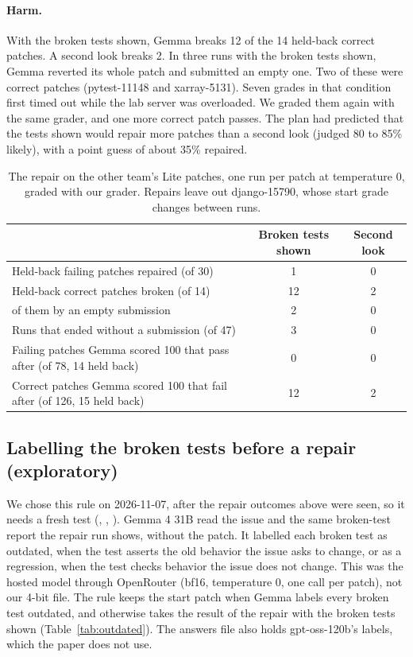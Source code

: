 \documentclass[10pt,letterpaper]{article}
\begin{document}
\paragraph{Harm.} With the broken tests shown, Gemma
breaks 12 of the 14 held-back correct patches. A second look breaks 2. In three runs with the broken tests shown,
Gemma reverted its whole patch and submitted an empty one. Two of these were correct patches (pytest-11148 and
xarray-5131). Seven grades in that condition first timed out while the lab server was overloaded. We graded them again
with the same grader, and one more correct patch passes. The plan had predicted that the tests shown would repair more
patches than a second look (judged 80 to 85\% likely), with a point guess of about 35\% repaired.

\begin{table}[H]
\centering
\small
\caption{The repair on the other team's Lite patches, one run per patch at temperature 0, graded with our grader.
Repairs leave out django-15790, whose start grade changes between runs.}
\label{tab:literepair}
\begin{tabular}{@{}lcc@{}}
\toprule
 & Broken tests shown & Second look \\
\midrule
Held-back failing patches repaired (of 30) & 1 & 0 \\
Held-back correct patches broken (of 14) & 12 & 2 \\
\quad of them by an empty submission & 2 & 0 \\
Runs that ended without a submission (of 47) & 3 & 0 \\
Failing patches Gemma scored 100 that pass after (of 78, 14 held back) & 0 & 0 \\
Correct patches Gemma scored 100 that fail after (of 126, 15 held back) & 12 & 2 \\
\bottomrule
\end{tabular}
\end{table}

\subsection*{Labelling the broken tests before a repair (exploratory)}

We chose this rule on 2026-11-07, after the repair outcomes above were seen, so it needs a fresh test
(, , ).
Gemma 4 31B read the issue and the same broken-test report the repair run shows, without the patch. It labelled each
broken test as outdated, when the test asserts the old behavior the issue asks to change, or as a regression, when the
test checks behavior the issue does not change. This was the hosted model through OpenRouter (bf16, temperature 0, one
call per patch), not our 4-bit file. The rule keeps the start patch when Gemma labels every broken test outdated, and
otherwise takes the result of the repair with the broken tests shown (Table~\ref{tab:outdated}). The answers file also
holds gpt-oss-120b's labels, which the paper does not use.
\end{document}
